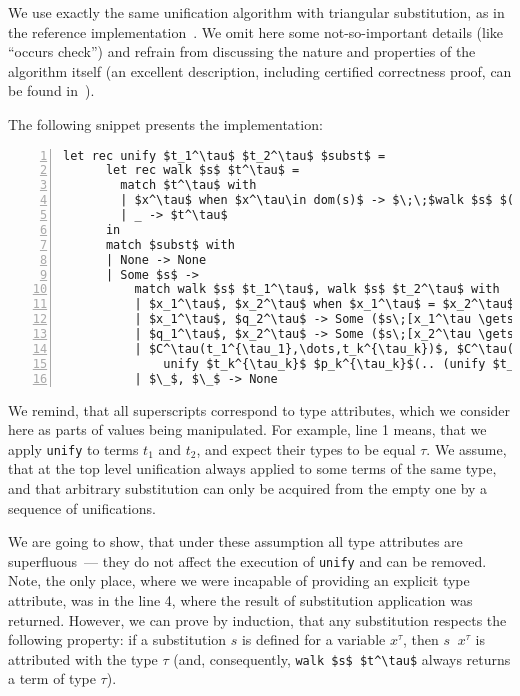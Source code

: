 We use exactly the same unification algorithm with triangular substitution, as in the reference implementation~\cite{MicroKanren}. We
omit here some not-so-important details (like ``occurs check'') and refrain from discussing the nature and properties of the algorithm
itself (an excellent description, including certified correctness proof, can be found in~\cite{Kumar}).

The following snippet presents the implementation:

\begin{lstlisting}[mathescape=true,numbers=left,numberstyle=\small,stepnumber=1,numbersep=-5pt]
    let rec unify $t_1^\tau$ $t_2^\tau$ $subst$ = 
      let rec walk $s$ $t^\tau$ = 
        match $t^\tau$ with
        | $x^\tau$ when $x^\tau\in dom(s)$ -> $\;\;$walk $s$ $(s\;\;x^\tau)$
        | _ -> $t^\tau$
      in
      match $subst$ with
      | None -> None
      | Some $s$ ->
          match walk $s$ $t_1^\tau$, walk $s$ $t_2^\tau$ with
          | $x_1^\tau$, $x_2^\tau$ when $x_1^\tau$ = $x_2^\tau$ -> $subst$
          | $x_1^\tau$, $q_2^\tau$ -> Some ($s\;[x_1^\tau \gets q_2^\tau]$)
          | $q_1^\tau$, $x_2^\tau$ -> Some ($s\;[x_2^\tau \gets q_1^\tau]$)
          | $C^\tau(t_1^{\tau_1},\dots,t_k^{\tau_k})$, $C^\tau(p_1^{\tau_1},\dots,p_k^{\tau_k})$ -> 
              unify $t_k^{\tau_k}$ $p_k^{\tau_k}$(.. (unify $t_1^{\tau_1}$ $p_1^{\tau_1}$ $subst$)$..$)
          | $\_$, $\_$ -> None
\end{lstlisting}

We remind, that all superscripts correspond to type attributes, which we consider here as 
parts of values being manipulated. For example, line 1 means, that we apply \lstinline{unify}
to terms $t_1$ and $t_2$, and expect their types to be equal $\tau$. We assume, that 
at the top level unification always applied to some terms of the same type, and that arbitrary
substitution can only be acquired from the empty one by a sequence of unifications.

We are going to show, that under these assumption all type attributes are superfluous~--- they
do not affect the execution of \lstinline{unify} and can be removed. Note, the only place, where we
were incapable of providing an explicit type attribute, was in the line 4, where the result of
substitution application was returned. However, we can prove by induction, that any substitution 
respects the following property: if a substitution $s$ is defined for a variable $x^\tau$,
then $s\;\;x^\tau$ is attributed with the type $\tau$ (and, consequently, \lstinline{walk $s$ $t^\tau$} always
returns a term of type $\tau$).

